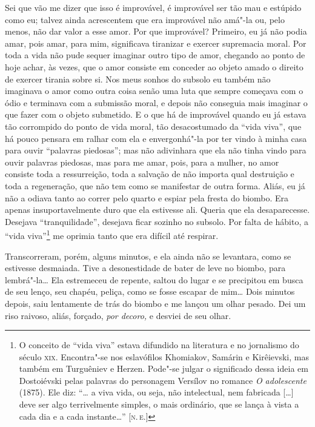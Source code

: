Sei que vão me dizer que isso é improvável, é improvável ser tão mau e
estúpido como eu; talvez ainda acrescentem que era improvável não amá"-la
ou, pelo menos, não dar valor a esse amor. Por que improvável? Primeiro,
eu já não podia amar, pois amar, para mim, significava tiranizar e
exercer supremacia moral. Por toda a vida não pude sequer imaginar outro
tipo de amor, chegando ao ponto de hoje achar, às vezes, que o amor
consiste em conceder ao objeto amado o direito de exercer tirania sobre
si. Nos meus sonhos do subsolo eu também não imaginava o amor como outra
coisa senão uma luta que sempre começava com o ódio e terminava com a
submissão moral, e depois não conseguia mais imaginar o que fazer com o
objeto submetido. E o que há de improvável quando eu já estava tão
corrompido do ponto de vida moral, tão desacostumado da ``vida viva'',
que há pouco pensara em ralhar com ela e envergonhá"-la por ter vindo à
minha casa para ouvir ``palavras piedosas''; mas não adivinhara que ela
não tinha vindo para ouvir palavras piedosas, mas para me amar, pois,
para a mulher, no amor consiste toda a ressurreição, toda a salvação de
não importa qual destruição e toda a regeneração, que não tem como se
manifestar de outra forma. Aliás, eu já não a odiava tanto ao correr
pelo quarto e espiar pela fresta do biombo. Era apenas insuportavelmente
duro que ela estivesse ali. Queria que ela desaparecesse. Desejava
``tranquilidade'', desejava ficar sozinho no subsolo. Por falta de
hábito, a ``vida viva''\footnote{O conceito de ``vida viva'' estava
  difundido na literatura e no jornalismo do século \textsc{xix}. Encontra"-se nos
  eslavófilos Khomiakov, Samárin e Kirêievski, mas também em Turguêniev
  e Herzen. Pode"-se julgar o significado dessa ideia em Dostoiévski
  pelas palavras do personagem Versílov no romance \emph{O adolescente}
  (1875). Ele diz: ``\ldots{} a viva vida, ou seja, não intelectual, nem
  fabricada {[}\ldots{}{]} deve ser algo terrivelmente simples, o mais
  ordinário, que se lança à vista a cada dia e a cada instante\ldots{}'' {[}\textsc{n.\,e.}{]}} me oprimia tanto que era difícil até respirar.

Transcorreram, porém, alguns minutos, e ela ainda não se levantara, como
se estivesse desmaiada. Tive a desonestidade de bater de leve no biombo,
para lembrá"-la\ldots{} Ela estremeceu de repente, saltou do lugar e se
precipitou em busca de seu lenço, seu chapéu, peliça, como se fosse
escapar de mim\ldots{} Dois minutos depois, saiu lentamente de trás do biombo
e me lançou um olhar pesado. Dei um riso raivoso, aliás, forçado,
\emph{por decoro,} e desviei de seu olhar.

